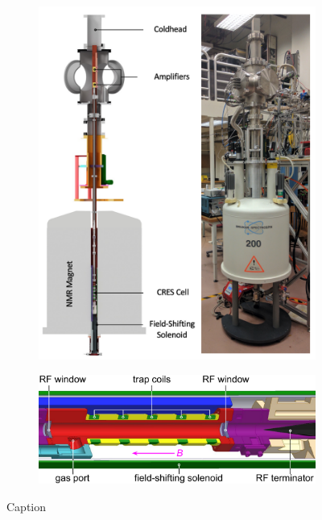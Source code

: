 \begin{figure}[htbp]
    \centering
    \begin{subfigure}{0.6\textwidth}
        \includegraphics[width=1\textwidth]{figs/Chapter-3/phaseII_system.png}
        \caption{}
    \end{subfigure}
    \hfill
    \begin{subfigure}{0.7\textwidth}
        \includegraphics[width=1\textwidth]{figs/Chapter-3/apparatus.pdf}
        \caption{}
    \end{subfigure}
    \caption{Caption}
    \label{fig:chap3-phase2-apparatus}
\end{figure}

